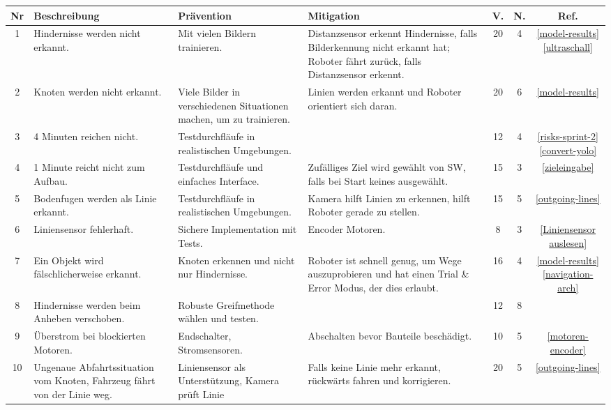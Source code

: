 \begin{table}[H]
\centering
\small
\begin{tabularx}{\textwidth}{|c|X|X|X|c|c|c|}
\hline
  \textbf{Nr} & \textbf{Beschreibung} & \textbf{Prävention} & \textbf{Mitigation} & \textbf{V.} & \textbf{N.} & \textbf{Ref.}\\
  \hline
      1&Hindernisse werden nicht erkannt. &Mit vielen Bildern trainieren.& Distanzsensor erkennt Hindernisse, falls Bilderkennung nicht erkannt hat; Roboter fährt zurück, falls Distanzsensor erkennt.&20&4& \makecell{\ref{model-results}\\ \ref{ultraschall}} \\
  \hline
2&Knoten werden nicht erkannt. &Viele Bilder in verschiedenen Situationen machen, um zu trainieren.&Linien werden erkannt und Roboter orientiert sich daran.&20& 6&\ref{model-results}\\
  \hline
      3&4 Minuten reichen nicht. &Testdurchfläufe in realistischen Umgebungen.&&12&4 &\makecell{\ref{risks-sprint-2}\\ \ref{convert-yolo}}\\
  \hline
      4& 1 Minute reicht nicht zum Aufbau.& Testdurchfläufe und einfaches Interface.&Zufälliges Ziel wird gewählt von SW, falls bei Start keines ausgewählt.&15&3 &\ref{zieleingabe}\\
  \hline
      5&Bodenfugen werden als Linie erkannt. & Testdurchfläufe in realistischen Umgebungen.&Kamera hilft Linien zu erkennen, hilft Roboter gerade zu stellen.&15&5& \ref{outgoing-lines}\\
  \hline
      6& Liniensensor fehlerhaft. &Sichere Implementation mit Tests.& Encoder Motoren.&8&3 &\ref{Liniensensor auslesen}\\
  \hline
      7& Ein Objekt wird fälschlicherweise erkannt. &Knoten erkennen und nicht nur Hindernisse.&Roboter ist schnell genug, um Wege auszuprobieren und hat einen Trial \& Error Modus, der dies erlaubt.&16&4& \makecell{\ref{model-results}\\ \ref{navigation-arch}}
\\
  \hline
      8&Hindernisse werden beim Anheben verschoben. &Robuste Greifmethode wählen und testen.&&12&8& \\
  \hline
      9&Überstrom bei blockierten Motoren. &Endschalter, Stromsensoren.&Abschalten bevor Bauteile beschädigt.&10&5& \ref{motoren-encoder} \\
  \hline
      10&Ungenaue Abfahrtssituation vom Knoten, Fahrzeug fährt von der Linie weg. &Liniensensor als Unterstützung, Kamera prüft Linie& Falls keine Linie mehr erkannt, rückwärts fahren und korrigieren.&20&5& \ref{outgoing-lines}\\

\end{tabularx}
\end{table}
